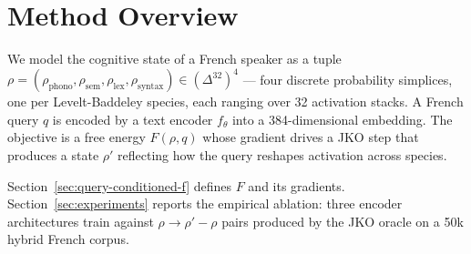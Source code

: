 \section{Method Overview}
\label{sec:method-overview}

We model the cognitive state of a French speaker as a tuple \(\rho = (\rho_{\mathrm{phono}}, \rho_{\mathrm{sem}}, \rho_{\mathrm{lex}}, \rho_{\mathrm{syntax}}) \in (\Delta^{32})^4\) --- four discrete probability simplices, one per Levelt-Baddeley species, each ranging over 32 activation stacks. A French query \( q \) is encoded by a text encoder \( f_\theta \) into a 384-dimensional embedding. The objective is a free energy \( F(\rho, q) \) whose gradient drives a JKO step that produces a state \(\rho'\) reflecting how the query reshapes activation across species.

Section~\ref{sec:query-conditioned-f} defines \( F \) and its gradients. Section~\ref{sec:experiments} reports the empirical ablation: three encoder architectures train against \(\rho \to \rho' - \rho\) pairs produced by the JKO oracle on a 50k hybrid French corpus.
